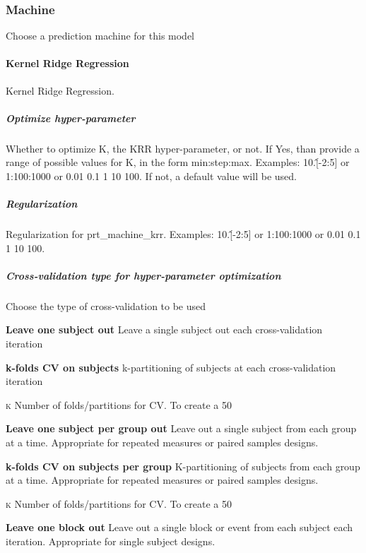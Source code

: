 \subsubsection{Machine}
Choose a prediction machine for this model


\paragraph{Kernel Ridge Regression}
Kernel Ridge Regression.


\subparagraph{Optimize hyper-parameter}
Whether to optimize K, the KRR hyper-parameter, or not. If Yes, than provide a range of possible values for K, in the form min:step:max. Examples: 10.\^[-2:5] or 1:100:1000 or 0.01 0.1 1 10 100. If not, a default value will be used.


\subparagraph{Regularization}
Regularization for prt\_machine\_krr. Examples: 10.\^[-2:5] or 1:100:1000 or 0.01 0.1 1 10 100.


\subparagraph{Cross-validation type for hyper-parameter optimization}
Choose the type of cross-validation to be used


\textbf{Leave one subject out}
Leave a single subject out each cross-validation iteration


\textbf{k-folds CV on subjects}
k-partitioning of subjects at each cross-validation iteration


\textsc{k}
Number of folds/partitions for CV. To create a 50%


\textbf{Leave one subject per group out}
Leave out a single subject from each group at a time. Appropriate for repeated measures or paired samples designs.


\textbf{k-folds CV on subjects per group}
K-partitioning of subjects from each group at a time. Appropriate for repeated measures or paired samples designs.


\textsc{k}
Number of folds/partitions for CV. To create a 50%


\textbf{Leave one block out}
Leave out a single block or event from each subject each iteration. Appropriate for single subject designs.


